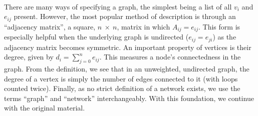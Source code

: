\documentclass[11pt]{article}
\begin{document}
\\
There are many ways of specifying a graph, the simplest being a list of all $v_{i}$ and $e_{ij}$ present. However, the most popular method of description is through an ``adjacency matrix'', a square, $n \ \times \ n$, matrix in which $A_{ij}=e_{ij}$. This form is especially helpful when the underlying graph is undirected ($e_{ij}=e_{ji}$) as the adjacency matrix becomes symmetric. An important property of vertices is their degree, given by $d_{i}=\sum\limits_{j=0}^n e_{ij}$. This measures a node's connectedness in the graph. From the definition, we see that in an unweighted, undirected graph, the degree of a vertex is simply the number of edges connected to it (with loops counted twice). Finally, as no strict definition of a network exists, we use the terms ``graph'' and ``network'' interchangeably. With this foundation, we continue with the original material.
\end{document}
